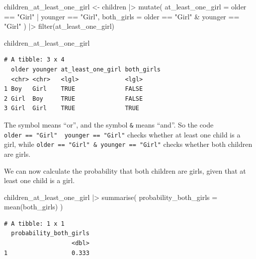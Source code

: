 \documentclass[
  letterpaper,
  DIV=11,
  numbers=noendperiod]{scrreprt}
\newenvironment{Shaded}{\begin{snugshade}}{\end{snugshade}}
\newcommand{\AttributeTok}[1]{\textcolor[rgb]{0.40,0.45,0.13}{#1}}
\newcommand{\FunctionTok}[1]{\textcolor[rgb]{0.28,0.35,0.67}{#1}}
\newcommand{\NormalTok}[1]{\textcolor[rgb]{0.00,0.23,0.31}{#1}}
\newcommand{\OtherTok}[1]{\textcolor[rgb]{0.00,0.23,0.31}{#1}}
\newcommand{\SpecialCharTok}[1]{\textcolor[rgb]{0.37,0.37,0.37}{#1}}
\newcommand{\StringTok}[1]{\textcolor[rgb]{0.13,0.47,0.30}{#1}}
\begin{document}
\begin{Shaded}
\begin{Highlighting}[]
\NormalTok{children\_at\_least\_one\_girl }\OtherTok{\textless{}{-}}\NormalTok{ children }\SpecialCharTok{|\textgreater{}}
  \FunctionTok{mutate}\NormalTok{(}
    \AttributeTok{at\_least\_one\_girl =}\NormalTok{ older }\SpecialCharTok{==} \StringTok{"Girl"} \SpecialCharTok{|}\NormalTok{ younger }\SpecialCharTok{==} \StringTok{"Girl"}\NormalTok{,}
    \AttributeTok{both\_girls =}\NormalTok{ older }\SpecialCharTok{==} \StringTok{"Girl"} \SpecialCharTok{\&}\NormalTok{ younger }\SpecialCharTok{==} \StringTok{"Girl"}
\NormalTok{  ) }\SpecialCharTok{|\textgreater{}}
  \FunctionTok{filter}\NormalTok{(at\_least\_one\_girl)}

\NormalTok{children\_at\_least\_one\_girl}
\end{Highlighting}
\end{Shaded}

\begin{verbatim}
# A tibble: 3 x 4
  older younger at_least_one_girl both_girls
  <chr> <chr>   <lgl>             <lgl>     
1 Boy   Girl    TRUE              FALSE     
2 Girl  Boy     TRUE              FALSE     
3 Girl  Girl    TRUE              TRUE      
\end{verbatim}

The symbol \texttt{\textbar{}} means ``or'', and the symbol \texttt{\&}
means ``and''. So the code
\texttt{older\ ==\ "Girl"\ \textbar{}\ younger\ ==\ "Girl"} checks
whether at least one child is a girl, while
\texttt{older\ ==\ "Girl"\ \&\ younger\ ==\ "Girl"} checks whether both
children are girls.

We can now calculate the probability that both children are girls, given
that at least one child is a girl.

\begin{Shaded}
\begin{Highlighting}[]
\NormalTok{children\_at\_least\_one\_girl }\SpecialCharTok{|\textgreater{}}
  \FunctionTok{summarise}\NormalTok{(}
    \AttributeTok{probability\_both\_girls =} \FunctionTok{mean}\NormalTok{(both\_girls)}
\NormalTok{  )}
\end{Highlighting}
\end{Shaded}

\begin{verbatim}
# A tibble: 1 x 1
  probability_both_girls
                   <dbl>
1                  0.333
\end{verbatim}
\end{document}
